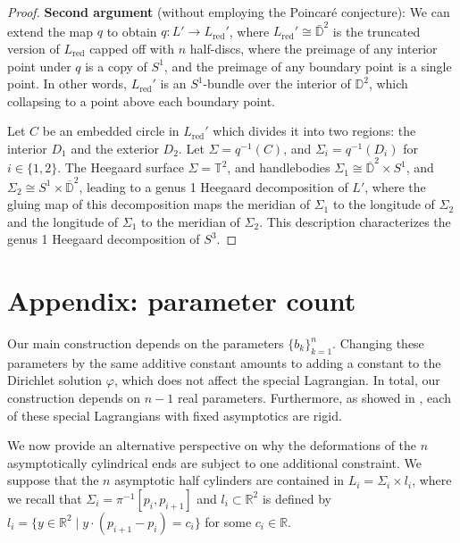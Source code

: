 \documentclass[11pt]{article}
\begin{document}
\begin{proof}
\textbf{Second argument} (without employing the Poincaré conjecture): We can extend the map $q$ to obtain $q: L' \to L_{\text{red}}'$, where $L_{\text{red}}' \cong \bar{\mathbb{D}}^2$ is the truncated version of $L_{\text{red}}$ capped off with $n$ half-discs, where the preimage of any interior point under $q$ is a copy of $S^1$, and the preimage of any boundary point is a single point. In other words, $L_{\text{red}}'$ is an $S^1$-bundle over the interior of $\mathbb{D}^2$, which collapsing to a point above each boundary point.

Let $C$ be an embedded circle in $L_{\text{red}}'$ which divides it into two regions: the interior $D_1$ and the exterior $D_2$. Let $\Sigma = q^{-1}(C)$, and $\Sigma_i = q^{-1}(D_i)$ for $i \in \{1,2\}$. The Heegaard surface $\Sigma = \mathbb{T}^2$, and handlebodies $\Sigma_1 \cong \overline{\mathbb{D}}^2 \times S^1$, and $\Sigma_2 \cong S^1 \times \overline{\mathbb{D}}^2$, leading to a genus 1 Heegaard decomposition of $L'$, where the gluing map of this decomposition maps the meridian of $\Sigma_1$ to the longitude of $\Sigma_2$ and the longitude of $\Sigma_1$ to the meridian of $\Sigma_2$. This description characterizes the genus 1 Heegaard decomposition of $S^3$.



\end{proof}

\section{Appendix: parameter count} \label{appendix}



















Our main construction depends on the parameters $\{b_k\}_{k=1}^n$. Changing these parameters by the same additive constant amounts to adding a constant to the Dirichlet solution $\varphi$, which does not affect the special Lagrangian. In total, our construction depends on $n-1$ real parameters. Furthermore, as showed in \cite{MR4495257}, each of these special Lagrangians with fixed asymptotics are rigid.


We now provide an alternative perspective on why the deformations of the $n$ asymptotically cylindrical ends are subject to one additional constraint. We suppose that the $n$ asymptotic half cylinders are contained in $L_i=\Sigma_i \times l_i$, where we recall that $\Sigma_i= \pi^{-1}[p_i,p_{i+1}]$ and $l_i\subset \mathbb{R}^2$ is defined by $l_i = \{y \in \mathbb{R}^2 \; | \;  y\cdot (p_{i+1}-p_i)=c_i\}$ for some $c_i \in \mathbb{R}$. 
\end{document}
